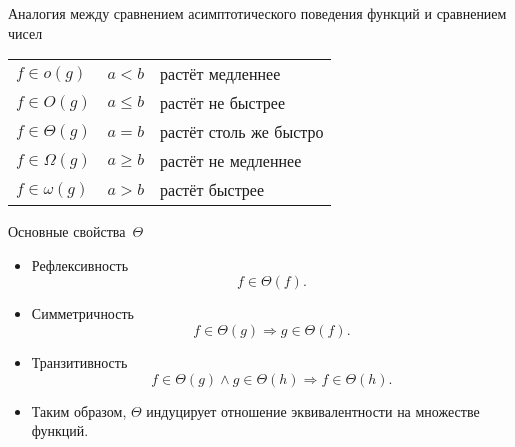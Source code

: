 \documentclass[landscape]{slides}
\begin{document}
\begin{slide}
  Аналогия между сравнением асимптотического поведения функций и сравнением чисел
  \begin{center}
    \begin{tabular}{lcl}
      $f\in o(g)$      & $a < b$         & растёт медленнее\\[1ex]
      $f\in O(g)$      & $a \leqslant b$ & растёт не быстрее\\[1ex]
      $f\in \Theta(g)$ & $a = b$         & растёт столь же быстро\\[1ex]
      $f\in \Omega(g)$ & $a \geqslant b$ & растёт не медленнее\\[1ex]
      $f\in \omega(g)$ & $a > b$         & растёт быстрее
    \end{tabular}
  \end{center}
\end{slide}

\begin{slide}
  Основные свойства~$\Theta$
  \begin{itemize}
    \item Рефлексивность
      \[
        f\in \Theta(f) .
      \]
    \item Симметричность
      \[
        f\in \Theta(g) \Rightarrow g\in \Theta(f) .
      \]
    \item Транзитивность
      \[
        f\in \Theta(g) \land g\in \Theta(h) \Rightarrow f\in \Theta(h) .
      \]
    \item Таким образом, $\Theta$ индуцирует отношение эквивалентности на множестве функций.
  \end{itemize}
\end{slide}
\end{document}
